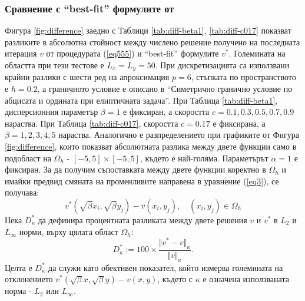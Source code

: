 \documentclass{article}
\newcommand{\be}{\begin{equation}}
\newcommand{\ee}{\end{equation}}
\newcommand{\rf}[1]{(\ref{#1})}
\theoremstyle{remark}
\begin{document}
\subsubsection{Сравнение с ``best-fit'' формулите от \cite{Ch2011} }
Фигура \ref{fig:difference} заедно с Таблици \ref{tab:diff-beta1}, \ref{tab:diff-c017} показват разликите в абсолютна стойност между числено решение получено на последната итерация $v$ от процедурата \rf{eq555} и ``best-fit'' формулите $v^*$. Големината на областта при тези тестове е $L_x = L_y = 50$. При дискретизацията са използвани крайни разлики с шести ред на апроксимация $p=6$, стъпката по пространството е $h=0.2$, а граничното условие е описано в ``Симетрично гранично условие по абцисата и ордината при елиптичната задача''. При Таблица \ref{tab:diff-beta1}, дисперсионния параметър $\beta=1$ е фиксиран, а скоростта $c = 0.1, 0.3, 0.5, 0.7, 0.9$ нараства. При Таблица \ref{tab:diff-c017}, скоростта $c = 0.17$ е фиксирана, а $\beta=1, 2, 3, 4, 5$ нараства. Аналогично е разпределението при графиките от Фигура \ref{fig:difference}, които показват абсолютната разлика между двете функции само в подобласт на $\Omega_h$ - $[-5,  5] \times [-5,5]$, където е най-голяма. Параметърът $\alpha = 1$ е фиксиран. За да получим съпоставката между двете функции коректно в $\Omega_h$ и имайки предвид смяната на променливите направена в уравнение \rf{eq3}, се получава:
\be
v^*\left(\sqrt{\beta}x_i,\sqrt{\beta}y_j\right)-v(x_i,y_j), \quad (x_i,y_j) \in \Omega_h
\ee
Нека $D^*_{\kappa}$ да дефинира процентната разликата между двете решения $v$ и $v^*$ в ${L_2 }$ и ${L_\infty}$ норми, върху цялата област $\Omega_h$:
\be\label{diffvv}
D^*_{\kappa} := 100 \times \frac{\Vert v^*-v \Vert_{\kappa} }{ \Vert v \Vert_{\kappa} }.
\ee
Целта е $D^*_{\kappa}$ да служи като обективен показател, който измерва големината на отклонението $v^*(\sqrt{\beta}x,\sqrt{\beta}y)-v(x,y)$, където с $\kappa$ е означена използваната норма - ${L_2 }$ или ${L_\infty}$.
\end{document}
